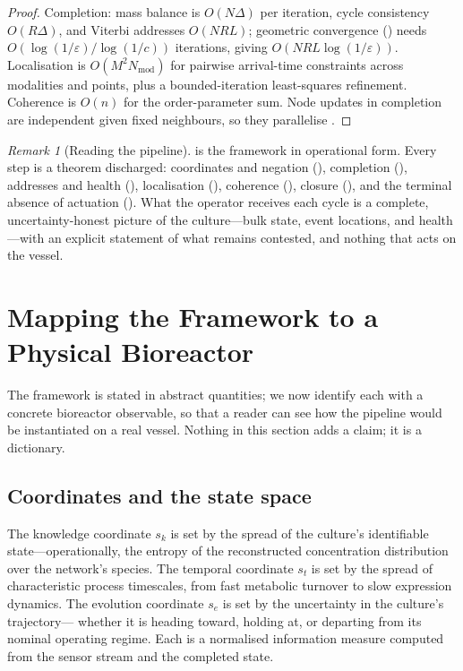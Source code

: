 \documentclass[11pt,twocolumn,a4paper]{article}
\theoremstyle{thmstyle}
\theoremstyle{definition}
\theoremstyle{remark}
\newtheorem{remark}[theorem]{Remark}
\newcommand{\Sk}{s_{k}}
\newcommand{\St}{s_{t}}
\newcommand{\Se}{s_{e}}
\newcommand{\eps}{\varepsilon}
\begin{document}
\begin{proof}
Completion: mass balance is $O(N\Delta)$ per iteration, cycle consistency
$O(R\Delta)$, and Viterbi addresses $O(N R L)$; geometric convergence
() needs $O(\log(1/\eps)/\log(1/c))$ iterations,
giving $O(N R L\log(1/\eps))$. Localisation is $O(M^2 N_{\mathrm{mod}})$ for
pairwise arrival-time constraints across modalities and points, plus a
bounded-iteration least-squares refinement. Coherence is $O(n)$ for the
order-parameter sum. Node updates in completion are independent given fixed
neighbours, so they parallelise
\citep{viterbi1967error,fang2008simple}.
\end{proof}

\begin{remark}[Reading the pipeline]
\label{rem:pipeline}
 is the framework in operational form. Every step is a
theorem discharged: coordinates and negation
(), completion (),
addresses and health (), localisation
(), coherence (), closure
(), and the terminal absence of actuation
(). What the operator receives each cycle is a
complete, uncertainty-honest picture of the culture---bulk state, event
locations, and health---with an explicit statement of what remains
contested, and nothing that acts on the vessel.
\end{remark}


\section{Mapping the Framework to a Physical Bioreactor}
\label{sec:mapping}

The framework is stated in abstract quantities; we now identify each with a
concrete bioreactor observable, so that a reader can see how the pipeline
would be instantiated on a real vessel. Nothing in this section adds a
claim; it is a dictionary.

\subsection{Coordinates and the state space}

The knowledge coordinate $\Sk$ is set by the spread of the culture's
identifiable state---operationally, the entropy of the reconstructed
concentration distribution over the network's species. The temporal
coordinate $\St$ is set by the spread of characteristic process timescales,
from fast metabolic turnover to slow expression dynamics. The evolution
coordinate $\Se$ is set by the uncertainty in the culture's trajectory---
whether it is heading toward, holding at, or departing from its nominal
operating regime. Each is a normalised information measure computed from the
sensor stream and the completed state.
\end{document}
